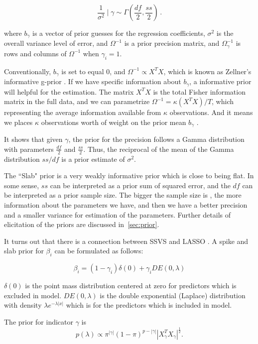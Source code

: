 $$\frac {1}{\sigma^{2}} \mid \gamma \sim  \Gamma(\frac{df}{2}, \frac{ss}{2})  \,  .$$


where $b_{\gamma}$ is a vector of prior guesses for the regression coefficients, $\sigma^{2}$ is the overall variance level of error, and $\Omega^{-1}$ is a prior precision matrix, and  $\Omega_{\gamma}^{-1}$  is rows and columns of  $\Omega^{-1}$ when $\gamma_i = 1$.


Conventionally,  $b_{\gamma}$ is set to equal $0$, and $\Omega^{-1} \propto X^T X$, which  is known as Zellner's informative g-prior \cite{Chipman2001}.  If we have specific information about $b_{\gamma}$, a informative prior will helpful for the estimation. The matrix $X^T X$ is the total Fisher information matrix in the full data, and we can  parametrize $\Omega^{-1} = \kappa (X^T X)/T$, which representing the average information available from $\kappa$ observations. And it means we places $\kappa$ observations worth of weight on the prior mean $b_{\gamma}$ \cite{Scott2014a}. 







It shows that given $\gamma$,  the prior for the precision follows a Gamma distribution with parameters $\frac{df}{2}$ and $\frac{ss}{2}$. Thus, the reciprocal of the mean of the Gamma distribution $ss/df$ is a prior estimate of $\sigma^2$. 

The ``Slab" prior is a very weakly informative prior which is close to being flat. In some sense,  $ss$ can be interpreted as a prior sum of squared error, and the $df$ can be interpreted as a prior sample size. The bigger the sample size is , the more information about the parameters we have, and then  we have a better precision and a smaller variance for estimation of the parameters. Further details of elicitation of the priors are discussed in~\cref{sec:prior}.

It turns out that there is a connection between SSVS and LASSO \cite{Yuan2005}. A spike and slab prior for $\beta_i$ can be formulated as follows:

$$ \beta_i = (1-\gamma_i) \delta(0) + \gamma_i DE(0, \lambda ) $$

$\delta(0)$ is the point mass distribution centered at zero for predictors which is excluded in model. $DE(0, \lambda )$ is the double exponential (Laplace) distribution with density $\lambda e^{−\lambda |x|}$ which is for the predictors which is included in model.

The prior for indicator $\gamma$ is 
$$p(\lambda)  \propto \pi^{|\gamma|}(1-\pi)^{p-|\gamma|} |X_{\gamma}^T X_{\gamma}|^{\frac{1}{2}}  .$$

